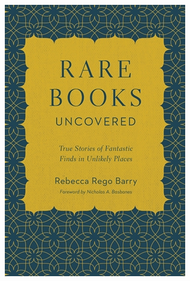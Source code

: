 \documentclass{tufte-handout}
\makeatletter
\newcommand{\varcaption}[2][0pt]{%
  \gsetlength{\@tufte@caption@vertical@offset}{-#1}%
  \gdef\@tufte@stored@varcaption{#2}%
}
\gdef\@tufte@stored@varcaption{} %
\makeatother
\begin{document}
\begin{marginfigure}[-22\baselineskip]
   \includegraphics[width=\linewidth]{images/rare_books.jpg}
   \varcaption{\href{https://www.quartoknows.com/books/9780760361573/Rare-Books-Uncovered.html}{Publisher Link}, \href{https://www.amazon.com/Rare-Books-Uncovered-Fantastic-Unlikely/dp/0760361576/}{Amazon Link}}
\end{marginfigure}
\end{document}
